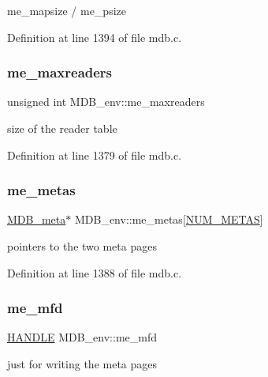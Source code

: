 me\+\_\+mapsize / me\+\_\+psize 

Definition at line 1394 of file mdb.\+c.

\mbox{\label{struct_m_d_b__env_a9049837fe4c45b663201ac4e078eaf19}} 
\subsubsection{\texorpdfstring{me\+\_\+maxreaders}{me\_maxreaders}}
{\footnotesize\ttfamily unsigned int M\+D\+B\+\_\+env\+::me\+\_\+maxreaders}

size of the reader table 

Definition at line 1379 of file mdb.\+c.

\mbox{\label{struct_m_d_b__env_a9ff38b60b2d18b585577107ab469592a}} 
\subsubsection{\texorpdfstring{me\+\_\+metas}{me\_metas}}
{\footnotesize\ttfamily \mbox{\hyperlink{struct_m_d_b__meta}{M\+D\+B\+\_\+meta}}$\ast$ M\+D\+B\+\_\+env\+::me\+\_\+metas\mbox{[}\mbox{\hyperlink{group__internal_gae066f6a2b21f2003b622dc654bc58327}{N\+U\+M\+\_\+\+M\+E\+T\+AS}}\mbox{]}}

pointers to the two meta pages 

Definition at line 1388 of file mdb.\+c.

\mbox{\label{struct_m_d_b__env_a8c5f5f596781bc4d39f0e76f244930b7}} 
\subsubsection{\texorpdfstring{me\+\_\+mfd}{me\_mfd}}
{\footnotesize\ttfamily \mbox{\hyperlink{group__compat_gab521aa5010fb1afb801a899a55569e03}{H\+A\+N\+D\+LE}} M\+D\+B\+\_\+env\+::me\+\_\+mfd}

just for writing the meta pages 

